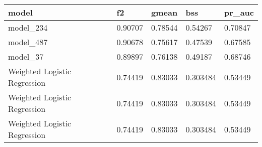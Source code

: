\begin{tabular}{|l|l|l|l|l|}
\hline
\textbf{model}               & \textbf{f2} & \textbf{gmean} & \textbf{bss} & \textbf{pr\_auc} \\ \hline
model\_234                   & 0.90707     & 0.78544        & 0.54267      & 0.70847          \\ \hline
model\_487                   & 0.90678     & 0.75617        & 0.47539      & 0.67585          \\ \hline
model\_37                    & 0.89897     & 0.76138        & 0.49187      & 0.68746          \\ \hline
Weighted Logistic Regression & 0.74419     & 0.83033        & 0.303484     & 0.53449          \\ \hline
Weighted Logistic Regression & 0.74419     & 0.83033        & 0.303484     & 0.53449          \\ \hline
Weighted Logistic Regression & 0.74419     & 0.83033        & 0.303484     & 0.53449          \\ \hline
\end{tabular}